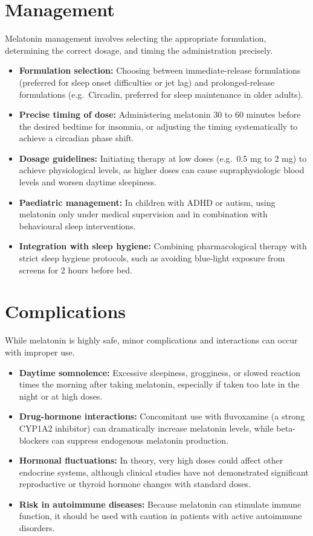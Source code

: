 \section*{Management}
Melatonin management involves selecting the appropriate formulation, determining the correct dosage, and timing the administration precisely.
\begin{itemize}
    \item \textbf{Formulation selection:} Choosing between immediate-release formulations (preferred for sleep onset difficulties or jet lag) and prolonged-release formulations (e.g.\ Circadin, preferred for sleep maintenance in older adults).
    \item \textbf{Precise timing of dose:} Administering melatonin 30 to 60 minutes before the desired bedtime for insomnia, or adjusting the timing systematically to achieve a circadian phase shift.
    \item \textbf{Dosage guidelines:} Initiating therapy at low doses (e.g.\ 0.5 mg to 2 mg) to achieve physiological levels, as higher doses can cause supraphysiologic blood levels and worsen daytime sleepiness.
    \item \textbf{Paediatric management:} In children with ADHD or autism, using melatonin only under medical supervision and in combination with behavioural sleep interventions.
    \item \textbf{Integration with sleep hygiene:} Combining pharmacological therapy with strict sleep hygiene protocols, such as avoiding blue-light exposure from screens for 2 hours before bed.
\end{itemize}

\section*{Complications}
While melatonin is highly safe, minor complications and interactions can occur with improper use.
\begin{itemize}
    \item \textbf{Daytime somnolence:} Excessive sleepiness, grogginess, or slowed reaction times the morning after taking melatonin, especially if taken too late in the night or at high doses.
    \item \textbf{Drug-hormone interactions:} Concomitant use with fluvoxamine (a strong CYP1A2 inhibitor) can dramatically increase melatonin levels, while beta-blockers can suppress endogenous melatonin production.
    \item \textbf{Hormonal fluctuations:} In theory, very high doses could affect other endocrine systems, although clinical studies have not demonstrated significant reproductive or thyroid hormone changes with standard doses.
    \item \textbf{Risk in autoimmune diseases:} Because melatonin can stimulate immune function, it should be used with caution in patients with active autoimmune disorders.
\end{itemize}

